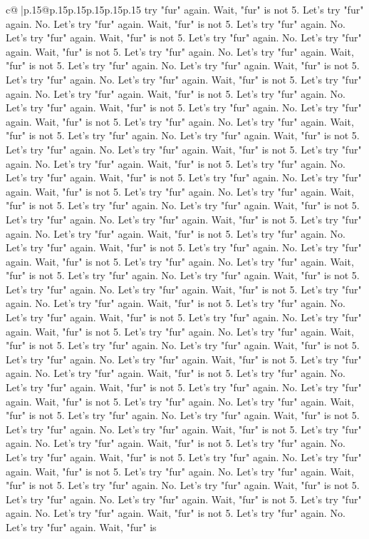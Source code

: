 \documentclass{article}
\begin{document}
{\begin{supertabular}{c@{$\;$}|p{.15\linewidth}@{}p{.15\linewidth}p{.15\linewidth}p{.15\linewidth}p{.15\linewidth}p{.15\linewidth}}
{{{try "fur" again. Wait, "fur" is not 5. Let's try "fur" again. No. Let's try "fur" again. Wait, "fur" is not 5. Let's try "fur" again. No. Let's try "fur" again. Wait, "fur" is not 5. Let's try "fur" again. No. Let's try "fur" again. Wait, "fur" is not 5. Let's try "fur" again. No. Let's try "fur" again. Wait, "fur" is not 5. Let's try "fur" again. No. Let's try "fur" again. Wait, "fur" is not 5. Let's try "fur" again. No. Let's try "fur" again. Wait, "fur" is not 5. Let's try "fur" again. No. Let's try "fur" again. Wait, "fur" is not 5. Let's try "fur" again. No. Let's try "fur" again. Wait, "fur" is not 5. Let's try "fur" again. No. Let's try "fur" again. Wait, "fur" is not 5. Let's try "fur" again. No. Let's try "fur" again. Wait, "fur" is not 5. Let's try "fur" again. No. Let's try "fur" again. Wait, "fur" is not 5. Let's try "fur" again. No. Let's try "fur" again. Wait, "fur" is not 5. Let's try "fur" again. No. Let's try "fur" again. Wait, "fur" is not 5. Let's try "fur" again. No. Let's try "fur" again. Wait, "fur" is not 5. Let's try "fur" again. No. Let's try "fur" again. Wait, "fur" is not 5. Let's try "fur" again. No. Let's try "fur" again. Wait, "fur" is not 5. Let's try "fur" again. No. Let's try "fur" again. Wait, "fur" is not 5. Let's try "fur" again. No. Let's try "fur" again. Wait, "fur" is not 5. Let's try "fur" again. No. Let's try "fur" again. Wait, "fur" is not 5. Let's try "fur" again. No. Let's try "fur" again. Wait, "fur" is not 5. Let's try "fur" again. No. Let's try "fur" again. Wait, "fur" is not 5. Let's try "fur" again. No. Let's try "fur" again. Wait, "fur" is not 5. Let's try "fur" again. No. Let's try "fur" again. Wait, "fur" is not 5. Let's try "fur" again. No. Let's try "fur" again. Wait, "fur" is not 5. Let's try "fur" again. No. Let's try "fur" again. Wait, "fur" is not 5. Let's try "fur" again. No. Let's try "fur" again. Wait, "fur" is not 5. Let's try "fur" again. No. Let's try "fur" again. Wait, "fur" is not 5. Let's try "fur" again. No. Let's try "fur" again. Wait, "fur" is not 5. Let's try "fur" again. No. Let's try "fur" again. Wait, "fur" is not 5. Let's try "fur" again. No. Let's try "fur" again. Wait, "fur" is not 5. Let's try "fur" again. No. Let's try "fur" again. Wait, "fur" is not 5. Let's try "fur" again. No. Let's try "fur" again. Wait, "fur" is not 5. Let's try "fur" again. No. Let's try "fur" again. Wait, "fur" is not 5. Let's try "fur" again. No. Let's try "fur" again. Wait, "fur" is not 5. Let's try "fur" again. No. Let's try "fur" again. Wait, "fur" is not 5. Let's try "fur" again. No. Let's try "fur" again. Wait, "fur" is not 5. Let's try "fur" again. No. Let's try "fur" again. Wait, "fur" is not 5. Let's try "fur" again. No. Let's try "fur" again. Wait, "fur" is not 5. Let's try "fur" again. No. Let's try "fur" again. Wait, "fur" is not 5. Let's try "fur" again. No. Let's try "fur" again. Wait, "fur" is not 5. Let's try "fur" again. No. Let's try "fur" again. Wait, "fur" is not 5. Let's try "fur" again. No. Let's try "fur" again. Wait, "fur" is not 5. Let's try "fur" again. No. Let's try "fur" again. Wait, "fur" is not 5. Let's try "fur" again. No. Let's try "fur" again. Wait, "fur" is }}}
\end{supertabular}}
\end{document}
